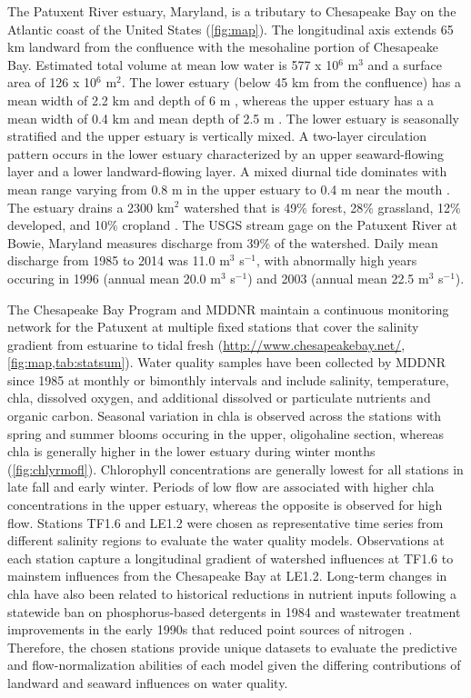 \documentclass{svjour3}\usepackage[]{graphicx}\usepackage[]{color}
\begin{document}
The Patuxent River estuary, Maryland, is a tributary to Chesapeake Bay on the Atlantic coast of the United States (\cref{fig:map}). The longitudinal axis extends 65 km landward from the confluence with the mesohaline portion of Chesapeake Bay.  Estimated total volume at mean low water is 577 x 10$^6$ m$^3$ and a surface area of 126 x 10$^6$ m$^2$.  The lower estuary (below 45 km from the confluence) has a mean width of 2.2 km and depth of 6 m \cite{Cronin75}, whereas the upper estuary has a a mean width of 0.4 km and mean depth of 2.5 m \cite{Hagythes}.  The lower estuary is seasonally stratified and the upper estuary is vertically mixed.  A two-layer circulation pattern occurs in the lower estuary characterized by an upper seaward-flowing layer and a lower landward-flowing layer.  A mixed diurnal tide dominates with mean range varying from 0.8 m in the upper estuary to 0.4 m near the mouth \cite{Boicourt98}.  The estuary drains a 2300 km$^2$ watershed that is 49\% forest, 28\% grassland, 12\% developed, and 10\% cropland \cite{Jordan03}.  The \ac{USGS} stream gage on the Patuxent River at Bowie, Maryland measures discharge from 39\% of the watershed.  Daily mean discharge from 1985 to 2014 was 11.0 m$^3$ s$^{-1}$, with abnormally high years occuring in 1996 (annual mean 20.0 m$^3$ s$^{-1}$) and 2003 (annual mean 22.5  m$^3$ s$^{-1}$). 

The Chesapeake Bay Program and \ac{MDDNR} maintain a continuous monitoring network for the Patuxent at multiple fixed stations that cover the salinity gradient from estuarine to tidal fresh (\href{http://www.chesapeakebay.net/}{http://www.chesapeakebay.net/}, \cref{fig:map,tab:statsum}).  Water quality samples have been collected by \ac{MDDNR} since 1985 at monthly or bimonthly intervals and include salinity, temperature, \ac{chla}, dissolved oxygen, and additional dissolved or particulate nutrients and organic carbon.  Seasonal variation in \ac{chla} is observed across the stations with spring and summer blooms occuring in the upper, oligohaline section, whereas \ac{chla} is generally higher in the lower estuary during winter months (\cref{fig:chlyrmofl}).  Chlorophyll concentrations are generally lowest for all stations in late fall and early winter.  Periods of low flow are associated with higher \ac{chla} concentrations in the upper estuary, whereas the opposite is observed for high flow.  Stations TF1.6 and LE1.2 were chosen as representative time series from different salinity regions to evaluate the water quality models.  Observations at each station capture a longitudinal gradient of watershed influences at TF1.6 to mainstem influences from the Chesapeake Bay at LE1.2.  Long-term changes in \ac{chla} have also been related to historical reductions in nutrient inputs following a statewide ban on phosphorus-based detergents in 1984 and wastewater treatment improvements in the early 1990s that reduced point sources of nitrogen \cite{Lung03,Testa08a}.  Therefore, the chosen stations provide unique datasets to evaluate the predictive and flow-normalization abilities of each model given the differing contributions of landward and seaward influences on water quality.
\end{document}
